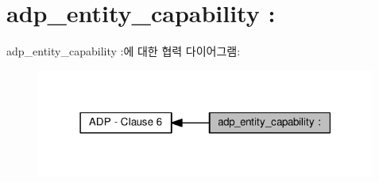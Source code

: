 \hypertarget{group__adp__entity__capability}{}\section{adp\+\_\+entity\+\_\+capability \+:}
\label{group__adp__entity__capability}
adp\+\_\+entity\+\_\+capability \+:에 대한 협력 다이어그램\+:
\nopagebreak
\begin{figure}[H]
\begin{center}
\leavevmode
\includegraphics[width=316pt]{group__adp__entity__capability}
\end{center}
\end{figure}
